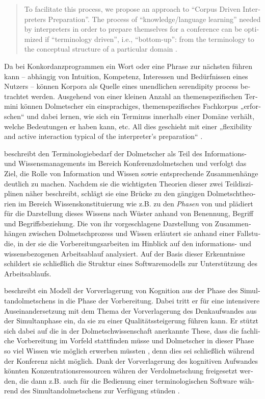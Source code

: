 \documentclass[output=paper]{LSP/langsci}
\begin{document}
\begin{otherlanguage}{ngerman}
\begin{quote}
To facilitate this process, we propose an approach to “Corpus Driven Interpreters Preparation”. The process of “knowledge/language learning” needed by interpreters in order to prepare themselves for a conference can be optimized if “terminology driven”, i.e., “bottom-up”: from the terminology to the conceptual structure of a particular domain \citep[174]{Fantinuoli2006}.
\end{quote}

Da bei Konkordanzprogrammen ein Wort oder eine Phrase zur nächsten führen kann -- abhängig von Intuition, Kompetenz, Interessen und Bedürfnissen eines Nutzers -- können Korpora als Quelle eines unendlichen serendipity process \citep{Johns1988} betrachtet werden. Ausgehend von einer kleinen Anzahl an themenspezifischen Termini können Dolmetscher ein einsprachiges, themenspezifisches Fachkorpus „erforschen“ und dabei lernen, wie sich ein Terminus innerhalb einer Domäne verhält, welche Bedeutungen er haben kann, etc. All dies geschieht mit einer „flexibility and active interaction typical of the interpreter's preparation“  \citep[174]{Fantinuoli2006}.

\citet{Rütten2007} beschreibt den Terminologiebedarf der Dolmetscher als Teil des Informations- und Wissensmanagements im Bereich Konferenzdolmetschen und verfolgt das Ziel, die Rolle von Information und Wissen sowie entsprechende Zusammenhänge deutlich zu machen. Nachdem sie die wichtigsten Theorien dieser zwei Teildisziplinen näher beschreibt, schlägt sie eine Brücke zu den gängigen Dolmetschtheorien im Bereich Wissenskonstituierung wie z.B. zu den \textit{Phasen} von \citet[778]{Kalina2005} und plädiert für die Darstellung dieses Wissens nach Wüster \citep[83]{Rütten2007} anhand von Benennung, Begriff und Begriffsbeziehung. Die von ihr vorgeschlagene Darstellung von Zusammenhängen zwischen Dolmetschprozess und Wissen erläutert sie anhand einer Fallstudie, in der sie die Vorbereitungsarbeiten im Hinblick auf den informations- und wissensbezogenen Arbeitsablauf analysiert. Auf der Basis dieser Erkenntnisse schildert sie schließlich die Struktur eines Softwaremodells zur Unterstützung des Arbeitsablaufs.

\citet{Stoll2009} beschreibt ein Modell der Vorverlagerung von Kognition aus der Phase des Simultandolmetschens in die Phase der Vorbereitung. Dabei tritt er für eine intensivere Auseinandersetzung mit dem Thema der Vorverlagerung des Denkaufwandes aus der Simultanphase ein, da sie zu einer Qualitätssteigerung führen kann. Er stützt sich dabei auf die in der Dolmetschwissenschaft anerkannte These, dass die fachliche Vorbereitung im Vorfeld stattfinden müsse und Dolmetscher in dieser Phase so viel Wissen wie möglich erwerben müssten \citep[147]{Gile1995}, denn dies sei schließlich während der Konferenz nicht möglich. Dank der Vorverlagerung des kognitiven Aufwandes könnten Konzentrationsressourcen währen der Verdolmetschung freigesetzt werden, die dann z.B. auch für die Bedienung einer terminologischen Software während des Simultandolmetschens zur Verfügung stünden \citep[49]{Stoll2002}.


\end{otherlanguage}
\end{document}
